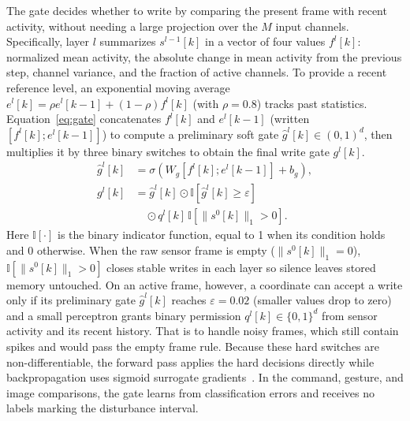 \documentclass[10pt,twocolumn]{article}
\newcommand{\ind}{\mathbb{I}}
\begin{document}
The gate decides whether to write by comparing the present frame with recent activity, without needing a large projection over the $M$ input channels. Specifically, layer $l$ summarizes $s^{l-1}[k]$ in a vector of four values $f^l[k]$: normalized mean activity, the absolute change in mean activity from the previous step, channel variance, and the fraction of active channels. To provide a recent reference level, an exponential moving average $e^l[k]=\rho e^l[k-1]+(1-\rho)f^l[k]$ (with $\rho=0.8$) tracks past statistics. Equation~\eqref{eq:gate} concatenates $f^l[k]$ and $e^l[k-1]$ (written $[f^l[k];e^l[k-1]]$) to compute a preliminary soft gate $\hat g^l[k]\in(0,1)^d$, then multiplies it by three binary switches to obtain the final write gate $g^l[k]$.
\begin{equation}
\begin{aligned}
 \hat g^l[k]&=\sigma\!\left(W_g[f^l[k];e^l[k-1]]+b_g\right),\\
 g^l[k]&=\hat g^l[k]\odot\ind[\hat g^l[k]\ge\varepsilon]\\
 &\quad\odot q^l[k]\,\ind[\|s^0[k]\|_1>0] .
\end{aligned}
\label{eq:gate}
\end{equation}
Here $\ind[\cdot]$ is the binary indicator function, equal to 1 when its condition holds and 0 otherwise. When the raw sensor frame is empty ($\|s^0[k]\|_1=0$), $\ind[\|s^0[k]\|_1>0]$ closes stable writes in each layer so silence leaves stored memory untouched. On an active frame, however, a coordinate can accept a write only if its preliminary gate $\hat g^l[k]$ reaches $\varepsilon=0.02$ (smaller values drop to zero) and a small perceptron grants binary permission $q^l[k]\in\{0,1\}^d$ from sensor activity and its recent history. That is to handle noisy frames, which still contain spikes and would pass the empty frame rule. Because these hard switches are non-differentiable, the forward pass applies the hard decisions directly while backpropagation uses sigmoid surrogate gradients~\cite{surrogate,spikingjelly}. In the command, gesture, and image comparisons, the gate learns from classification errors and receives no labels marking the disturbance interval.
\end{document}
